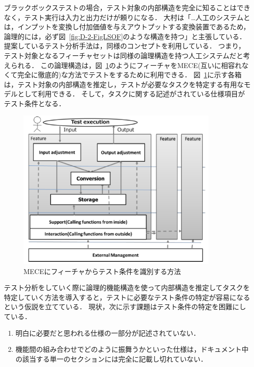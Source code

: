 ブラックボックステストの場合，テスト対象の内部構造を完全に知ることはできなく，テスト実行は入力と出力だけが頼りになる．
大村は「…人工のシステムとは，インプットを変換し付加価値を与えアウトプットする変換装置であるため，論理的には，必ず図~\ref{fig:D-2-FigLSOF}のような構造を持つ\cite{LSOF}」と主張している．
提案しているテスト分析手法は，同様のコンセプトを利用している．
つまり，テスト対象となるフィーチャセットは同様の論理構造を持つ人工システムだと考えられる．
この論理構造は，図~\ref{fig:D-3-Fig3}のようにフィーチャをMECE(互いに相容れなくて完全に徹底的)\cite{ethan1999mckinsey}な方法でテストをするために利用できる．
図~\ref{fig:D-3-Fig3}に示す各箱は，テスト対象の内部構造を推定し，テストが必要なタスクを特定する有用なモデルとして利用できる．
そして，タスクに関する記述がされている仕様項目がテスト条件となる．
\begin{figure}[htbp]
  \begin{center}
	\includegraphics[width=10cm]{./image/D-3-Fig3.png}
	\caption{MECEにフィーチャからテスト条件を識別する方法}
	\label{fig:D-3-Fig3}
  \end{center}
\end{figure}

テスト分析をしていく際に論理的機能構造を使って内部構造を推定してタスクを特定していく方法を導入すると，テストに必要なテスト条件の特定が容易になるという仮説を立てている．
現状，次に示す課題はテスト条件の特定を困難にしている．

\begin{enumerate}
\item 明白に必要だと思われる仕様の一部分が記述されていない．
\item 機能間の組み合わせでどのように振舞うかといった仕様は，ドキュメント中の該当する単一のセクションには完全に記載し切れていない．
\end{enumerate}

